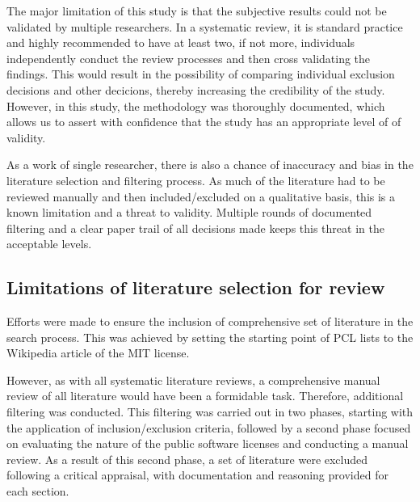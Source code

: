 The major limitation of this study is that the subjective results could not be validated by multiple researchers. In a systematic review, it is standard practice and highly recommended to have at least two, if not more, individuals independently conduct the review processes and then cross validating the findings. This would result in the possibility of comparing individual exclusion decisions and other decicions, thereby increasing the credibility of the study. However, in this study, the methodology was thoroughly documented, which allows us to assert with confidence that the study has an appropriate level of of validity.

As a work of single researcher, there is also a chance of inaccuracy and bias in the literature selection and filtering process. As much of the literature had to be reviewed manually and then included/excluded on a qualitative basis, this is a known limitation and a threat to validity. Multiple rounds of documented filtering and a clear paper trail of all decisions made keeps this threat in the acceptable levels.

\subsection{Limitations of literature selection for review}
Efforts were made to ensure the inclusion of comprehensive set of literature in the search process. This was achieved by setting the starting point of PCL lists to the Wikipedia article of the MIT license.

However, as with all systematic literature reviews, a comprehensive manual review of all literature would have been a formidable task. Therefore, additional filtering was conducted. This filtering was carried out in two phases, starting with the application of inclusion/exclusion criteria, followed by a second phase focused on evaluating the nature of the public software licenses and conducting a manual review. As a result of this second phase, a set of literature were excluded following a critical appraisal, with documentation and reasoning provided for each section.


